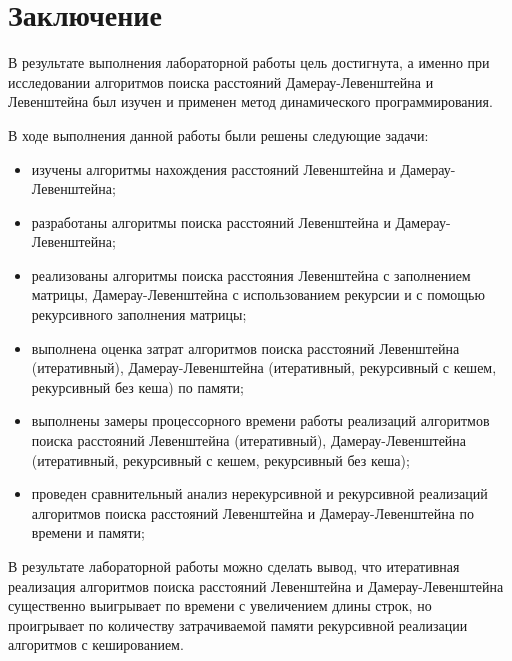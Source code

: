 \chapter*{Заключение}

В результате выполнения лабораторной работы цель достигнута, а именно при исследовании алгоритмов поиска расстояний Дамерау-Левенштейна и Левенштейна был изучен и применен метод динамического программирования.

В ходе выполнения данной работы были решены следующие задачи:

\begin{itemize}
    \item изучены алгоритмы нахождения расстояний Левенштейна и Дамерау-Левенштейна;
	\item разработаны алгоритмы поиска расстояний Левенштейна и Дамерау-Левенштейна;
	\item реализованы алгоритмы поиска расстояния Левенштейна с заполнением матрицы, Дамерау-Левенштейна с использованием рекурсии и с помощью рекурсивного заполнения матрицы;
	\item выполнена оценка затрат алгоритмов поиска расстояний Левенштейна (итеративный), Дамерау-Левенштейна (итеративный, рекурсивный с кешем, рекурсивный без кеша) по памяти;
	\item выполнены замеры процессорного времени работы реализаций алгоритмов поиска расстояний Левенштейна (итеративный), Дамерау-Левенштейна (итеративный, рекурсивный с кешем, рекурсивный без кеша);
	\item проведен сравнительный анализ нерекурсивной и рекурсивной реализаций алгоритмов поиска расстояний Левенштейна и Дамерау-Левенштейна по времени и памяти;
\end{itemize}

В результате лабораторной работы можно сделать вывод, что итеративная реализация алгоритмов поиска расстояний Левенштейна и Дамерау-Левенштейна существенно выигрывает по времени с увеличением длины строк, но проигрывает по количеству затрачиваемой памяти рекурсивной реализации алгоритмов с кешированием.
